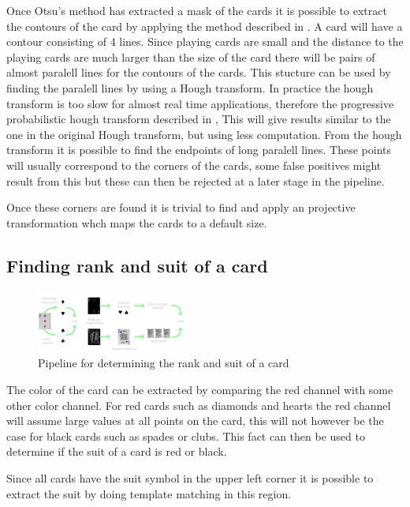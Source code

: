 \documentclass[journal,twoside]{IEEEtran}
\begin{document}
Once Otsu's method has extracted a mask of the cards it is possible to extract the contours of the card by applying the method described in \cite{CONTOURS}. A card will have a contour consisting of 4 lines. Since playing cards are small and the distance to the playing cards are much larger than the size of the card there will be pairs of almost paralell lines for the contours of the cards. This stucture can be used by finding the paralell lines by using a Hough transform. In practice the hough transform is too slow for almost real time applications, therefore the progressive probabilistic hough transform described in \cite{HoughP}, This will give results similar to the one in the original Hough transform, but using less computation. From the hough transform it is possible to find the endpoints of long paralell lines. These points will usually correspond to the corners of the cards, some false positives might result from this but these can then be rejected at a later stage in the pipeline.

Once these corners are found it is trivial to find and apply an projective transformation whch maps the cards to a default size.

\subsection{Finding rank and suit of a card}

\begin{figure}[placement h]
\centering
\includegraphics[width=0.45\textwidth]{images/recognition.png}
\caption{Pipeline for determining the rank and suit of a card}
\label{fig:RankSuitOutline}
\end{figure}

The color of the card can be extracted by comparing the red channel with some other color channel. For red cards such as diamonds and hearts the red channel will assume large values at all points on the card, this will not however be the case for black cards such as spades or clubs. This fact can then be used to determine if the suit of a card is red or black.

Since all cards have the suit symbol in the upper left corner it is possible to extract the suit by doing template matching in this region.
\end{document}
